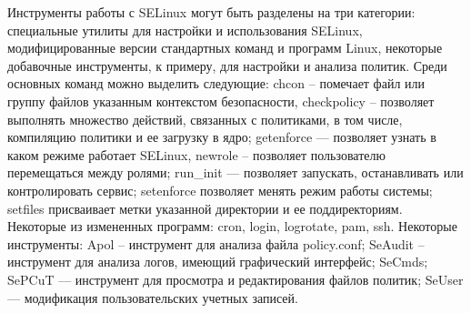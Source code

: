 Инструменты работы с SELinux могут быть разделены на 
три категории: специальные утилиты для настройки и 
использования SELinux, модифицированные версии стандартных 
команд и программ Linux, некоторые добавочные инструменты,
к примеру, для настройки и анализа политик. Среди основных 
команд можно выделить следующие: chcon – помечает файл или 
группу файлов указанным контекстом безопасности, checkpolicy
– позволяет выполнять множество действий, связанных с 
политиками, в том числе, компиляцию политики и ее загрузку 
в ядро; getenforce — позволяет узнать в каком режиме 
работает SELinux, newrole – позволяет пользователю 
перемещаться между ролями; run\_init — позволяет 
запускать, останавливать или контролировать сервис; 
setenforce позволяет менять режим работы системы; 
setfiles присваивает метки указанной директории и ее 
поддиректориям. Некоторые из измененных программ: cron, 
login, logrotate, pam, ssh. Некоторые инструменты: Apol 
– инструмент для анализа файла policy.conf; SeAudit – 
инструмент для анализа логов, имеющий графический интерфейс; 
SeCmds; SePCuT — инструмент для просмотра и редактирования 
файлов политик; SeUser — модификация пользовательских 
учетных записей. 

\bigskip
